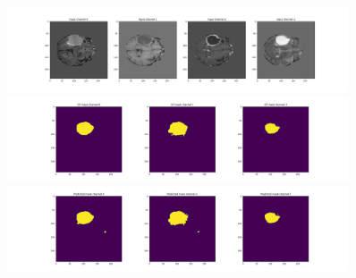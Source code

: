 \documentclass[onecolumn]{article}
\begin{document}
\begin{figure}[!ht]
	\centering
	\includegraphics[width=0.9\textwidth]{imgs/inputs2.png}
	\includegraphics[width=0.9\textwidth]{imgs/gt2.png}
	\includegraphics[width=0.9\textwidth]{imgs/pred2.png}
	\caption{}
	\label{fig:}
\end{figure}

\newpage




	
\end{document}
